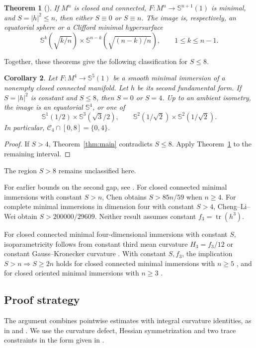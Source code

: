 \documentclass[11pt,a4paper]{amsart}
\numberwithin{equation}{section}
\newtheorem{theorem}{Theorem}[section]
\newtheorem{corollary}[theorem]{Corollary}
\theoremstyle{definition}
\theoremstyle{remark}
\DeclareMathOperator{\tr}{tr}
\newcommand{\Sph}{\mathbb S}
\begin{document}
\begin{theorem}[\cite{Simons,Lawson,CDK}]\label{thm:first}
If $M^n$ is closed and connected, $F:M^n\to\Sph^{n+1}(1)$ is minimal,
and $S=|h|^2\le n$, then either $S\equiv0$ or $S\equiv n$. The image is,
respectively, an equatorial sphere or a Clifford minimal hypersurface
\[
 \Sph^k\!\left(\sqrt{k/n}\right)\times
 \Sph^{n-k}\!\left(\sqrt{(n-k)/n}\right),\qquad 1\le k\le n-1.
\]
\end{theorem}

Together, these theorems give the following classification for $S\le8$.

\begin{corollary}\label{cor:main}
Let $F:M^4\to\Sph^5(1)$ be a smooth minimal immersion of a nonempty
closed connected manifold. Let $h$ be its second fundamental form.
If $S=|h|^2$ is constant and $S\le8$, then $S=0$ or $S=4$.
Up to an ambient isometry, the image
is an equatorial $\Sph^4$, or one of
\[
 \Sph^1(1/2)\times\Sph^3(\sqrt3/2),\qquad
 \Sph^2(1/\sqrt2)\times\Sph^2(1/\sqrt2).
\]
In particular, $\mathcal C_4\cap[0,8]=\{0,4\}$.
\end{corollary}
\begin{proof}
If $S>4$, Theorem~\ref{thm:main} contradicts $S\le8$. Apply
Theorem~\ref{thm:first} to the remaining interval.
\end{proof}
The region $S>8$ remains unclassified here.

For earlier bounds on the second gap, see \cite{PT1,PT2,SY}. For closed connected
minimal immersions with constant $S>n$, Chen \cite[Theorem~1.1]{Chen}
obtains $S>85n/59$ when $n\ge4$. For complete minimal immersions in
dimension four with constant $S>4$, Cheng--Li--Wei
\cite[Theorem~1.2]{CLW} obtain $S>200000/29609$.
Neither result assumes constant $f_3=\tr(h^3)$.

For closed connected minimal four-dimensional immersions with constant
$S$, isoparametricity follows from constant third mean curvature
$H_3=f_3/12$ \cite[Theorem~1.8]{HXZ} or constant Gauss--Kronecker
curvature \cite[Theorem~1.1]{GLLY}. With constant $S,f_3$, the implication
$S>n\Rightarrow S\ge2n$ holds for closed connected minimal immersions
with $n\ge5$ \cite[Theorem~1.1]{GTYZ}, and for closed oriented minimal
immersions with $n\ge3$ \cite[Theorem~1.1]{Guan}.

\subsection*{Proof strategy}
The argument combines pointwise estimates with integral curvature
identities, as in
\cite[Sections~2 and~4]{LXX} and \cite[Section~4]{Chen}.
We use the curvature defect, Hessian symmetrization and two trace
constraints in the form given in \cite[Sections~2.2, 3.1 and~3.3]{Chen}.
\end{document}
